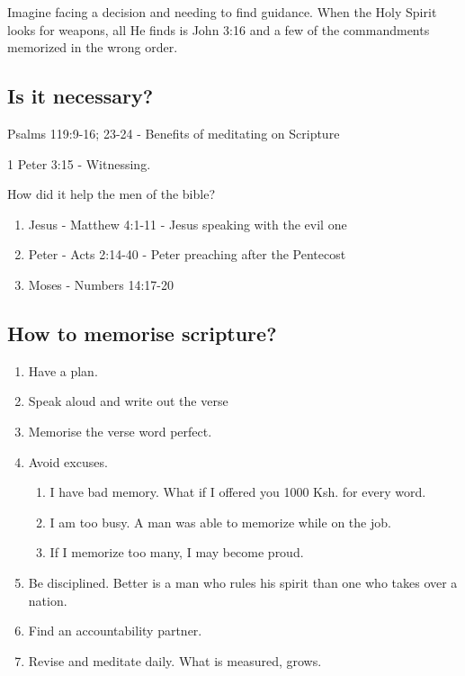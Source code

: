 \documentclass[
  letterpaper,
  DIV=11,
  numbers=noendperiod]{scrartcl}
\providecommand{\tightlist}{%
  \setlength{\itemsep}{0pt}\setlength{\parskip}{0pt}}
\begin{document}
Imagine facing a decision and needing to find guidance. When the Holy
Spirit looks for weapons, all He finds is John 3:16 and a few of the
commandments memorized in the wrong order.

\subsection{Is it necessary?}\label{is-it-necessary}

Psalms 119:9-16; 23-24 - Benefits of meditating on Scripture

1 Peter 3:15 - Witnessing.

How did it help the men of the bible?

\begin{enumerate}
\def\labelenumi{\arabic{enumi}.}
\tightlist
\item
  Jesus - Matthew 4:1-11 - Jesus speaking with the evil one\\
\item
  Peter - Acts 2:14-40 - Peter preaching after the Pentecost\\
\item
  Moses - Numbers 14:17-20
\end{enumerate}

\subsection{How to memorise scripture?}\label{how-to-memorise-scripture}

\begin{enumerate}
\def\labelenumi{\arabic{enumi}.}
\item
  Have a plan.\\
\item
  Speak aloud and write out the verse\\
\item
  Memorise the verse word perfect.\\
\item
  Avoid excuses.

  \begin{enumerate}
  \def\labelenumii{\alph{enumii}.}
  \tightlist
  \item
    I have bad memory. What if I offered you 1000 Ksh. for every word.\\
  \item
    I am too busy. A man was able to memorize while on the job.\\
  \item
    If I memorize too many, I may become proud.
  \end{enumerate}
\item
  Be disciplined. Better is a man who rules his spirit than one who
  takes over a nation.
\item
  Find an accountability partner.
\item
  Revise and meditate daily. What is measured, grows.
\end{enumerate}
\end{document}
